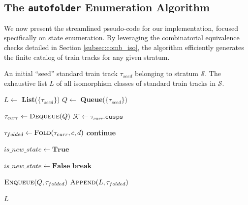 \subsection{The \texttt{autofolder} Enumeration Algorithm}

We now present the streamlined pseudo-code for our implementation, focused specifically on state enumeration. By leveraging the combinatorial equivalence checks detailed in Section \ref{subsec:comb_iso}, the algorithm efficiently generates the finite catalog of train tracks for any given stratum.

\begin{algorithm}[H]
\caption{autofolder: Train Track Enumeration}
\label{alg:autofolder_enum}
\begin{algorithmic}[1]
\Require An initial ``seed'' standard train track $\tau_{seed}$ belonging to stratum $\mathcal{S}$.
\Ensure The exhaustive list $L$ of all isomorphism classes of standard train tracks in $\mathcal{S}$.

\State $L \gets$ \textbf{List}($\{ \tau_{seed} \}$) 
\State $Q \gets$ \textbf{Queue}($\{ \tau_{seed} \}$) 

    \State $\tau_{curr} \gets \Call{Dequeue}{Q}$
    \State $\mathcal{K} \gets \tau_{curr}.\texttt{cusps}$

            \State {}
            \State $\tau_{folded} \gets \Call{Fold}{\tau_{curr}, c, d}$
             \textbf{continue} \EndIf

            \State {}
            \State $is\_new\_state \gets \textbf{True}$

                    \State $is\_new\_state \gets \textbf{False}$
                    \State \textbf{break}
                \EndIf
            \EndFor

            \State {}
                \State $\Call{Enqueue}{Q, \tau_{folded}}$
                \State $\Call{Append}{L, \tau_{folded}}$
            \EndIf
        \EndFor
    \EndFor
\EndWhile

\State \Return $L$
\end{algorithmic}
\end{algorithm}

